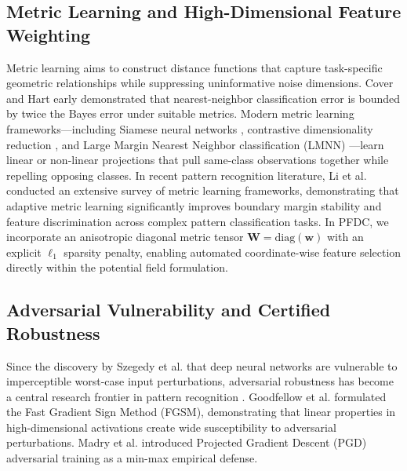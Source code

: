 \documentclass[times, review, 10pt]{elsarticle}
\begin{document}
\subsection{Metric Learning and High-Dimensional Feature Weighting}
Metric learning aims to construct distance functions that capture task-specific geometric relationships while suppressing uninformative noise dimensions. Cover and Hart \cite{cover1967nearest} early demonstrated that nearest-neighbor classification error is bounded by twice the Bayes error under suitable metrics. Modern metric learning frameworks---including Siamese neural networks \cite{bromley1993signature}, contrastive dimensionality reduction \cite{hadsell2006dimensionality}, and Large Margin Nearest Neighbor classification (LMNN) \cite{weinberger2009distance}---learn linear or non-linear projections that pull same-class observations together while repelling opposing classes. In recent pattern recognition literature, Li et al. \cite{li2023deep} conducted an extensive survey of metric learning frameworks, demonstrating that adaptive metric learning significantly improves boundary margin stability and feature discrimination across complex pattern classification tasks. In PFDC, we incorporate an anisotropic diagonal metric tensor $\mathbf{W} = \mathrm{diag}(\mathbf{w})$ with an explicit $\ell_1$ sparsity penalty, enabling automated coordinate-wise feature selection directly within the potential field formulation.

\subsection{Adversarial Vulnerability and Certified Robustness}
Since the discovery by Szegedy et al. \cite{szegedy2014intriguing} that deep neural networks are vulnerable to imperceptible worst-case input perturbations, adversarial robustness has become a central research frontier in pattern recognition \cite{szegedy2014intriguing,goodfellow2014explaining}. Goodfellow et al. \cite{goodfellow2014explaining} formulated the Fast Gradient Sign Method (FGSM), demonstrating that linear properties in high-dimensional activations create wide susceptibility to adversarial perturbations. Madry et al. \cite{madry2018towards} introduced Projected Gradient Descent (PGD) adversarial training as a min-max empirical defense. 
\end{document}
